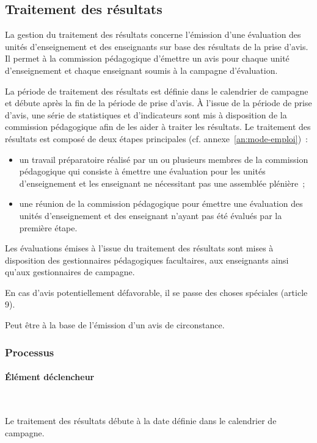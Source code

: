 \documentclass[a4paper,11pt]{report}
\begin{document}
\subsection{Traitement des résultats}
La gestion du traitement des résultats concerne l'émission d'une évaluation des unités d'enseignement et des enseignants sur base des résultats de la prise d'avis.
Il permet à la commission pédagogique d'émettre un avis pour chaque unité d'enseignement et chaque enseignant soumis à la campagne d'évaluation.

La période de traitement des résultats est définie dans le calendrier de campagne et débute après la fin de la période de prise d'avis.
À l'issue de la période de prise d'avis, une série de statistiques et d'indicateurs sont mis à disposition de la commission pédagogique afin de les aider à traiter les résultats.
Le traitement des résultats est composé de deux étapes principales (cf. annexe~\ref{an:mode-emploi})~:
\begin{itemize}
	\item un travail préparatoire réalisé par un ou plusieurs membres de la commission pédagogique qui consiste à émettre une évaluation pour les unités d'enseignement et les enseignant ne nécessitant pas une assemblée plénière~;
	\item une réunion de la commission pédagogique pour émettre une évaluation des unités d'enseignement et des enseignant n'ayant pas été évalués par la première étape.
\end{itemize}

Les évaluations émises à l'issue du traitement des résultats sont mises à disposition des gestionnaires pédagogiques facultaires, aux enseignants ainsi qu'aux gestionnaires de campagne.

En cas d'avis potentiellement défavorable, il se passe des choses spéciales (article 9).

Peut être à la base de l'émission d'un avis de circonstance.


\subsubsection{Processus}
\paragraph{Élément déclencheur}~\newline{}

Le traitement des résultats débute à la date définie dans le calendrier de campagne.
\end{document}
